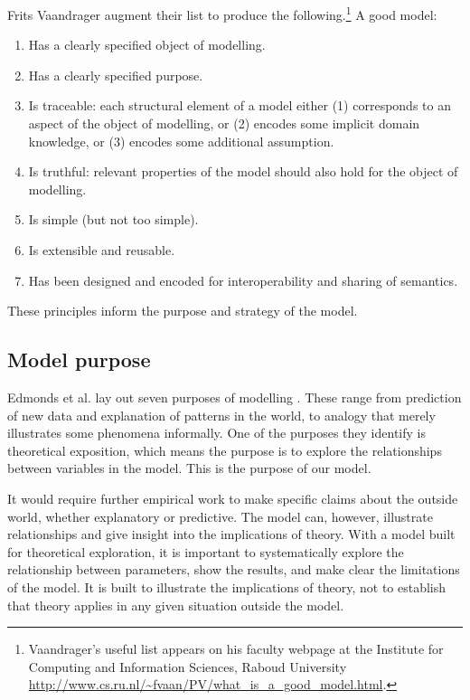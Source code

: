 Frits Vaandrager %
augment their list to produce the following.\footnote{Vaandrager's useful list appears on his faculty webpage at the Institute for Computing and Information Sciences, Raboud University \url{http://www.cs.ru.nl/~fvaan/PV/what_is_a_good_model.html}. %
} A good model: \begin{enumerate}
     \item Has a clearly specified object of modelling.
     \item Has a clearly specified purpose.
     \item Is traceable: each structural element of a model either (1) corresponds to an aspect of the object of modelling, or (2) encodes some implicit domain knowledge, or (3) encodes some additional assumption.
     \item Is truthful: relevant properties of the model should also hold for the object of modelling.
     \item Is simple (but not too simple).
     \item Is extensible and reusable.
     \item Has been designed and encoded for interoperability and sharing of semantics.
 \end{enumerate}

These principles inform the purpose and strategy of the model.

\subsection{Model purpose}

Edmonds et al. lay out seven purposes of modelling \cite{edmondsDifferentModellingPurposes2019}. These range from prediction of new data and explanation of patterns in the world, to analogy that merely illustrates some phenomena informally. %
One of the purposes they identify is \gls{theoretical exposition}, which means the purpose is to explore the relationships between variables in the model. This is the purpose of our model. %

It would require further empirical work to make specific claims about 
the outside world, whether explanatory or predictive. The  model can, however, illustrate relationships and give insight into the implications of theory. With a model built for theoretical exploration, it is important to systematically explore the relationship between parameters, show the results, and %
make clear the limitations of the model. It is built to illustrate the implications of theory, not to establish that theory applies in any given situation outside the model. 


